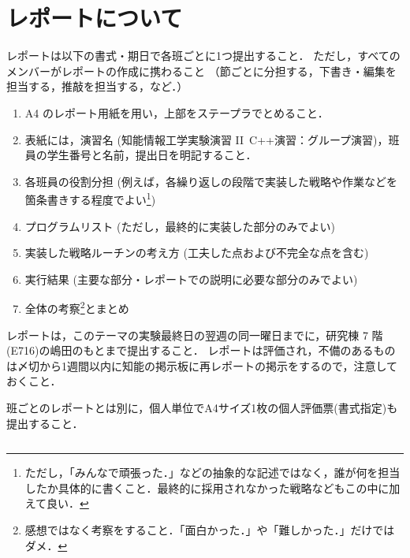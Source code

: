 \section{レポートについて}
レポートは以下の書式・期日で各班ごとに1つ提出すること．
ただし，すべてのメンバーがレポートの作成に携わること
（節ごとに分担する，下書き・編集を担当する，推敲を担当する，など．）
\begin{enumerate}
 \item A4 のレポート用紙を用い，上部をステープラでとめること．\vspace*{-0.5em}
 \item 表紙には，演習名 (知能情報工学実験演習 II\ C++演習：グループ演習)，班員の学生番号と名前，提出日を明記すること．\vspace*{-0.5em}
 \item 各班員の役割分担 (例えば，各繰り返しの段階で実装した戦略や作業などを箇条書きする程度でよい\footnote{ただし，「みんなで頑張った．」などの抽象的な記述ではなく，誰が何を担当したか具体的に書くこと．最終的に採用されなかった戦略などもこの中に加えて良い．})\vspace*{-0.5em}
 \item プログラムリスト (ただし，最終的に実装した部分のみでよい)\vspace*{-0.5em}
 \item 実装した戦略ルーチンの考え方 (工夫した点および不完全な点を含む)\vspace*{-0.5em}
 \item 実行結果 (主要な部分・レポートでの説明に必要な部分のみでよい)\vspace*{-0.5em}
 \item 全体の考察\footnote{感想ではなく考察をすること．「面白かった．」や「難しかった．」だけではダメ．}とまとめ\vspace*{-0.5em}
 \end{enumerate}
レポートは，このテーマの実験最終日の翌週の同一曜日までに，研究棟 7 階(E716)の嶋田のもとまで提出すること．
レポートは評価され，不備のあるものは〆切から1週間以内に知能の掲示板に再レポートの掲示をするので，注意しておくこと．

班ごとのレポートとは別に，個人単位でA4サイズ1枚の個人評価票(書式指定)も提出すること．


\begin{quote}
\begin{verbatim}

\end{verbatim}
\end{quote}

